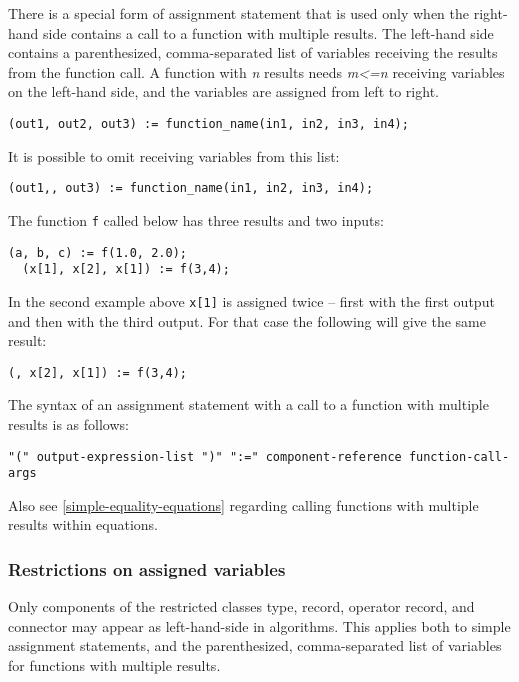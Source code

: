 There is a special form of assignment statement that is used only when
the right-hand side contains a call to a function with multiple results.
The left-hand side contains a parenthesized, comma-separated list of
variables receiving the results from the function call. A function with
\emph{n} results needs \emph{m\textless{}=n} receiving variables on the
left-hand side, and the variables are assigned from left to right.

\begin{lstlisting}[language=modelica]
(out1, out2, out3) := function_name(in1, in2, in3, in4);
\end{lstlisting}

It is possible to omit receiving variables from this list:
\begin{lstlisting}[language=modelica]
(out1,, out3) := function_name(in1, in2, in3, in4);
\end{lstlisting}

\begin{example}
The function \lstinline!f! called below has three results and two inputs:
\begin{lstlisting}[language=modelica]
  (a, b, c) := f(1.0, 2.0);
  (x[1], x[2], x[1]) := f(3,4);
\end{lstlisting}
In the second example above \lstinline!x[1]! is assigned twice -- first
with the first output and then with the third output. For that case the
following will give the same result:
\begin{lstlisting}[language=modelica]
  (, x[2], x[1]) := f(3,4);
\end{lstlisting}
\end{example}

The syntax of an assignment statement with a call to a function with
multiple results is as follows:
\begin{lstlisting}[language=grammar]
"(" output-expression-list ")" ":=" component-reference function-call-args
\end{lstlisting}

\begin{nonnormative}
Also see \autoref{simple-equality-equations} regarding calling functions with
multiple results within equations.
\end{nonnormative}

\subsubsection{Restrictions on assigned variables}
Only components of the restricted classes type, record, operator record, and connector may appear as left-hand-side in algorithms.
This applies both to simple assignment statements, and the parenthesized, comma-separated list of variables for functions with multiple results.

